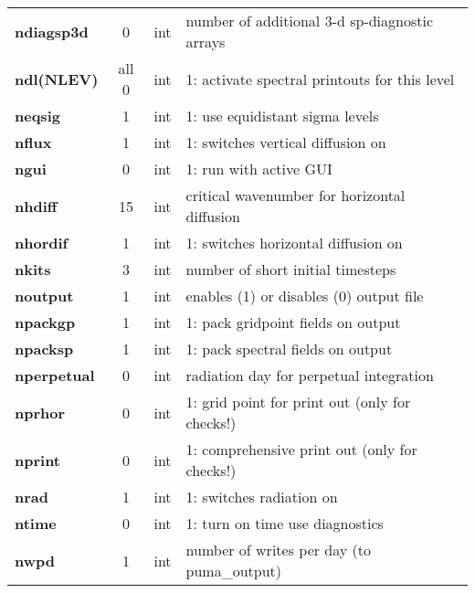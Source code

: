 \begin{tabular}{|l|c|l|l|}
{\bf ndiagsp3d }&   0 & int & number of additional 3-d sp-diagnostic arrays \\
{\bf ndl(NLEV) }&all 0& int & 1: activate spectral printouts for this level \\
{\bf neqsig    }&   1 & int & 1: use equidistant sigma levels \\
{\bf nflux     }&   1 & int & 1: switches vertical diffusion on \\
{\bf ngui      }&   0 & int & 1: run with active GUI \\
{\bf nhdiff    }&  15 & int & critical wavenumber for horizontal diffusion \\
{\bf nhordif   }&   1 & int & 1: switches horizontal diffusion on \\
{\bf nkits     }&   3 & int & number of short initial timesteps \\       
{\bf noutput   }&   1 & int & enables (1) or disables (0) output file \\
{\bf npackgp   }&   1 & int & 1: pack gridpoint fields on output \\
{\bf npacksp   }&   1 & int & 1: pack spectral fields on output \\
{\bf nperpetual}&   0 & int & radiation day for perpetual integration \\
{\bf nprhor    }&   0 & int & 1: grid point for print out (only for checks!) \\
{\bf nprint    }&   0 & int & 1: comprehensive print out (only for checks!) \\
{\bf nrad      }&   1 & int & 1: switches radiation on  \\
{\bf ntime     }&   0 & int & 1: turn on time use diagnostics \\
{\bf nwpd      }&   1 & int & number of writes per day (to puma\_output) \\
\hline
\end{tabular}

\newpage

